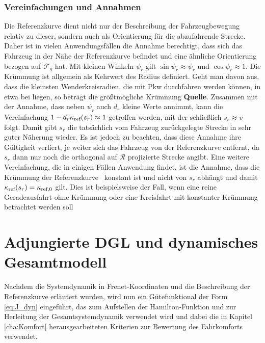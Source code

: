 \subsubsection{Vereinfachungen und Annahmen}\label{subsubsec:Vereinfachungen}
Die Referenzkurve dient nicht nur der Beschreibung der Fahrzeugbewegung relativ zu dieser, sondern auch als Orientierung für die abzufahrende Strecke. Daher ist in vielen Anwendungsfällen die Annahme berechtigt, dass sich das Fahrzeug in der Nähe der Referenzkurve befindet und eine ähnliche Orientierung bezogen auf $\mathcal{F}_g$ hat. Mit kleinen Winkeln $\psi_r$ gilt $\sin{\psi_r}\approx\psi_r$ und $\cos{\psi_r}\approx 1$. Die Krümmung ist allgemein als Kehrwert des Radius definiert. Geht man davon aus, dass die kleinsten Wenderkreisradien, die mit Pkw durchfahren werden können, in etwa bei  liegen, so beträgt die größtmögliche Krümmung  \textbf{Quelle}. Zusammen mit der Annahme, dass neben $\psi_r$ auch $d_r$ kleine Werte annimmt, kann die Vereinfachung $1-d_r\kappa_{\textrm{ref}}(s_r)\approx 1$ getroffen werden, mit der schließlich $\dot{s}_r\approx v$ folgt. Damit gibt $s_r$ die tatsächlich vom Fahrzeug zurückgelegte Strecke in sehr guter Näherung wieder. Es ist jedoch zu beachten, dass diese Annahme ihre Gültigkeit verliert, je weiter sich das Fahrzeug von der Referenzkurve entfernt, da $s_r$ dann nur noch die orthogonal auf $\mathcal{R}$ projizierte Strecke angibt. Eine weitere Vereinfachung, die in einigen Fällen Anwendung findet, ist die Annahme, dass die Krümmung der Referenzkurve \kapparefofs~konstant ist und nicht von $s_r$ abhängt und damit $\kappa_{\textrm{ref}}(s_r)=\kappa_{\textrm{ref},0}$ gilt. Dies ist beispielsweise der Fall, wenn eine reine Geradeausfahrt ohne Krümmung oder eine Kreisfahrt mit konstanter Krümmung betrachtet werden soll

\section{Adjungierte \gls{DGL} und dynamisches Gesamtmodell}\label{sec:Systemdynamik}
Nachdem die Systemdynamik in Frenet-Koordinaten und die Beschreibung der Referenzkurve erläutert wurden, wird nun ein Gütefunktional der Form \eqref{eq:J_dyn} eingeführt, das zum Aufstellen der Hamilton-Funktion und zur Herleitung der Gesamtsystemdynamik verwendet wird und dabei die in Kapitel \ref{cha:Komfort} herausgearbeiteten Kriterien zur Bewertung des Fahrkomforts verwendet.

